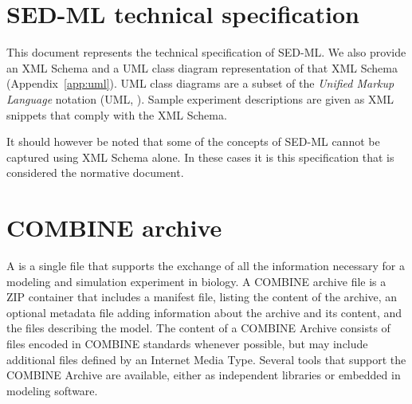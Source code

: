 \documentclass[pdftex,rgb,dvipsnames,svgnames,hyperref,table]{report}
\begin{document}

\tableofcontents
\newpage


\chapter{SED-ML technical specification}
\label{chp:specification}

This document represents the technical specification of SED-ML. We also provide an XML Schema \citep{xmls} and a UML class diagram representation of that XML Schema (Appendix~\ref{app:uml}). UML class diagrams are a subset of the \emph{Unified Markup Language} notation (UML, \citep{uml22}). Sample experiment descriptions are given as XML snippets that comply with the XML Schema.

It should however be noted that some of the concepts of SED-ML cannot be captured using XML Schema alone. In these cases it is this specification that is considered the normative document. 









\chapter{COMBINE archive}
\label{app:archive}

A  \citep{Bergmann2014} is a single file that supports the exchange of all the information necessary for a modeling and simulation experiment in biology. A COMBINE archive file is a ZIP container that includes a manifest file, listing the content of the archive, an optional metadata file adding information about the archive and its content, and the files describing the model. The content of a COMBINE Archive consists of files encoded in COMBINE standards whenever possible, but may include additional files defined by an Internet Media Type. Several tools that support the COMBINE Archive are available, either as independent libraries or embedded in modeling software.
\end{document}
